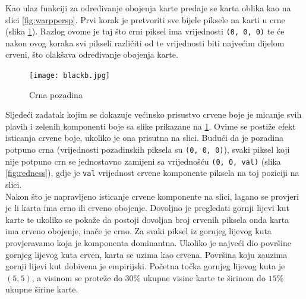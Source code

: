 \documentclass[times, zavrsni, numeric, utf8]{fer}
\newcommand{\code}[1]{\texttt{#1}}
\begin{document}
Kao ulaz funkciji za određivanje obojenja karte predaje se karta oblika kao na slici \ref{fig:warppersp}. Prvi korak je pretvoriti sve bijele piksele na karti u crne (slika \ref{fig:blackb}). Razlog ovome je taj što crni piksel ima vrijednosti \code{(0, 0, 0)} te će nakon ovog koraka svi pikseli različiti od te vrijednosti biti najvećim dijelom crveni, što olakšava određivanje obojenja karte. 
\begin{figure}[H]
\centering
\texttt{[image: blackb.jpg]}
\caption{Crna pozadina}
\label{fig:blackb}
\end{figure}
Sljedeći zadatak kojim se dokazuje većinsko prisustvo crvene boje je micanje svih plavih i zelenih komponenti boje sa slike prikazane na \ref{fig:blackb}. Ovime se postiže efekt isticanja crvene boje, ukoliko je ona prisutna na slici. Budući da je pozadina potpuno crna (vrijednosti pozadinskih piksela su \code{(0, 0, 0)}), svaki piksel koji nije potpuno crn se jednostavno zamijeni sa vrijednošću \code{(0, 0, val)} (slika \ref{fig:redness}), gdje je \code{val} vrijednost crvene komponente piksela na toj poziciji na slici. \\
\hspace*{0.5cm}Nakon što je napravljeno isticanje crvene komponente na slici, lagano se provjeri je li karta ima crno ili crveno obojenje. Dovoljno je pregledati gornji lijevi kut karte te ukoliko se pokaže da postoji dovoljan broj crvenih piksela onda karta ima crveno obojenje, inače je crno. Za svaki piksel iz gornjeg lijevog kuta provjeravamo koja je komponenta dominantna. Ukoliko je najveći dio površine gornjeg lijevog kuta crven, karta se uzima kao crvena. Površina koju zauzima gornji lijevi kut dobivena je empirijski. Početna točka gornjeg lijevog kuta je $(5, 5)$, a visinom se proteže do $30\%$ ukupne visine karte te širinom do $15\%$ ukupne širine karte.
\end{document}
